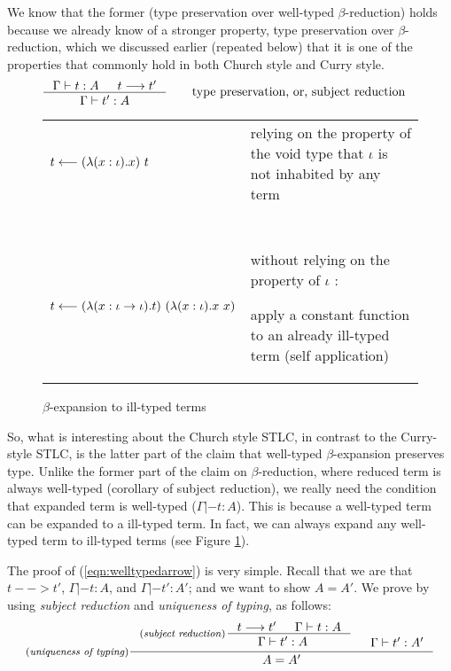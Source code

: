 We know that the former (type preservation over well-typed $\beta$-reduction)
holds because we already know of a stronger property,
type preservation over $\beta$-reduction, which we discussed earlier
(repeated below) that it is one of the properties that commonly hold
in both Church style and Curry style.
\begin{align*}
\inference{\Gamma |- t : A  & t --> t'}{\Gamma |- t' : A}
 &\qquad \text{type preservation, or, subject reduction}
\end{align*}

\begin{figure}
\begin{singlespace}
\begin{tabular}{lp{7cm}}
$t <-- (\lambda(x:\iota).x)~t$ &
relying on the property of the void type
that $\iota$ is not inhabited by any term
\\ ~ \\
$t <-- (\lambda(x:\iota -> \iota).t)~(\lambda(x:\iota).x~x)$ &
without relying on the property of $\iota$ : \par
apply a constant function to an already ill-typed term (self application)
\end{tabular}
\end{singlespace}
\caption{$\beta$-expansion to ill-typed terms}
\label{ill-typed_expand}
\end{figure}

So, what is interesting about the Church style STLC, in contrast to
the Curry-style STLC, is the latter part of the claim that
well-typed $\beta$-expansion preserves type. Unlike the former part of
the claim on $\beta$-reduction, where reduced term is always well-typed
(corollary of subject reduction), we really need the condition that
expanded term is well-typed ($\Gamma |- t : A$). This is because a well-typed
term can be expanded to a ill-typed term. In fact, we can always expand any
well-typed term to ill-typed terms (see Figure \ref{ill-typed_expand}).

The proof of (\ref{eqn:welltypedarrow}) is very simple.
Recall that we are that $t --> t'$, $\Gamma |- t : A$,
and $\Gamma |- t' : A'$; and we want to show $A = A'$.
We prove by using \emph{subject reduction} and \emph{uniqueness of typing},
as follows:
\[ \inference[(\emph{uniqueness of typing})]
	{ \inference[(\emph{subject reduction})\!\!\!]
		{t --> t' & \Gamma |- t : A}
		{\Gamma |- t' : A \phantom{a_f}} 
	& \Gamma |- t' : A' }
	{ A = A' }
\]

